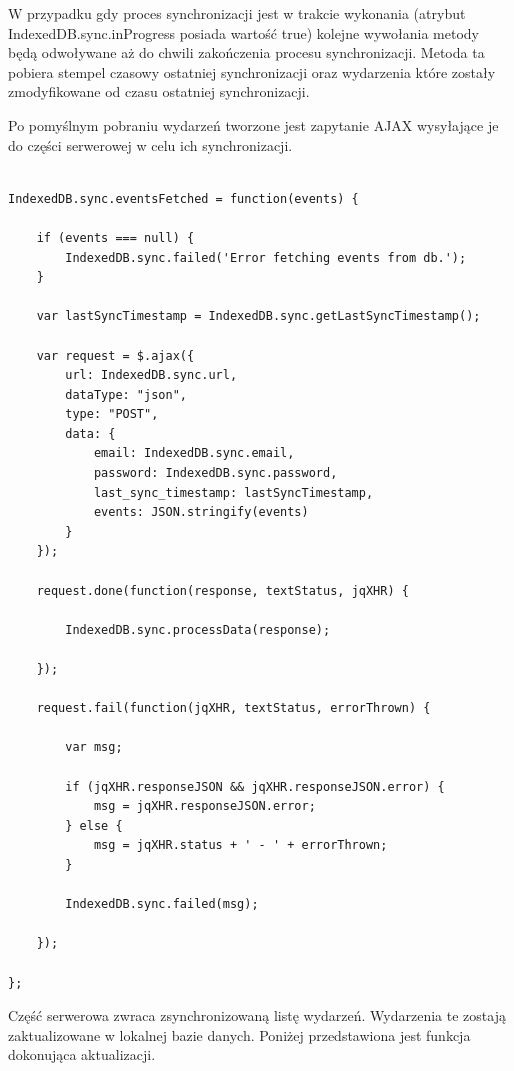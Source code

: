 W przypadku gdy proces synchronizacji jest w trakcie wykonania (atrybut  IndexedDB.sync.inProgress posiada wartość true) kolejne wywołania metody będą odwoływane aż do chwili zakończenia procesu synchronizacji. Metoda ta pobiera stempel czasowy ostatniej synchronizacji oraz wydarzenia które zostały zmodyfikowane od czasu ostatniej synchronizacji.

Po pomyślnym pobraniu wydarzeń tworzone jest zapytanie AJAX wysyłające je do części serwerowej w celu ich synchronizacji.

\begin{lstlisting}[caption=Wysłanie żądania synchronizacji do części serwerowej., label=amb, captionpos=b]

IndexedDB.sync.eventsFetched = function(events) {

	if (events === null) {
    	IndexedDB.sync.failed('Error fetching events from db.');
	}

	var lastSyncTimestamp = IndexedDB.sync.getLastSyncTimestamp();

	var request = $.ajax({
    	url: IndexedDB.sync.url,
    	dataType: "json",
    	type: "POST",
    	data: {
        	email: IndexedDB.sync.email,
        	password: IndexedDB.sync.password,
        	last_sync_timestamp: lastSyncTimestamp,
        	events: JSON.stringify(events)
    	}
	});

	request.done(function(response, textStatus, jqXHR) {

    	IndexedDB.sync.processData(response);

	});

	request.fail(function(jqXHR, textStatus, errorThrown) {

    	var msg;

    	if (jqXHR.responseJSON && jqXHR.responseJSON.error) {
        	msg = jqXHR.responseJSON.error;
    	} else {
        	msg = jqXHR.status + ' - ' + errorThrown;
    	}

    	IndexedDB.sync.failed(msg);

	});

};
\end{lstlisting}

Część serwerowa zwraca zsynchronizowaną listę wydarzeń. Wydarzenia te zostają zaktualizowane w lokalnej bazie danych. Poniżej przedstawiona jest funkcja dokonująca aktualizacji.

